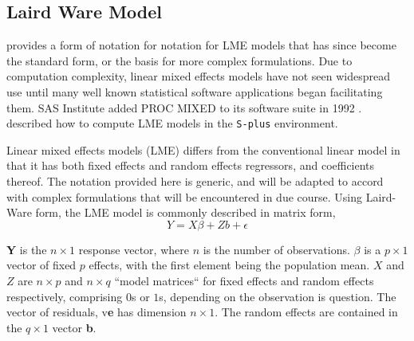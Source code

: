 \documentclass[12pt, a4paper]{report}
\theoremstyle{plain}
\theoremstyle{definition}
\theoremstyle{remark}
\begin{document}
	\subsection{Laird Ware Model} 
	\citet{LW82} provides a form of notation for notation for LME models that has since become the standard form, or the basis for more complex formulations. Due to computation complexity, linear mixed effects models have not seen widespread use until many well known statistical software applications began facilitating them. SAS Institute added PROC MIXED to its software suite in 1992 \citep{singer}. \citet{PB} described how to compute LME models in the \texttt{S-plus} environment.
	
	Linear mixed effects models (LME)
	differs from the conventional linear model in that it has both
	fixed effects and random effects regressors, and coefficients
	thereof. The notation provided here is generic, and will be adapted to accord with complex formulations that will be encountered in due course. Using Laird-Ware form, the LME model is commonly described in matrix form,
	\begin{equation}
	Y = X\beta + Zb + \epsilon
	\label{LW}
	\end{equation}
	
	\textbf{Y} is the $n
	\times 1$ response vector, where  $n$ is the number of observations. \textbf{$\beta$} is a $p \times 1$ vector of fixed $p$ effects, with the
	first element being the population mean. $X$ and $Z$ are $n \times p$ and $n \times q$ ``model matrices`` for fixed effects and random effects respectively, comprising
	$0$s or $1$s, depending on the observation is question. The vector of residuals, v\textbf{e} has
	dimension $n \times 1$. The random effects are contained in the  $q \times
	1$ vector \textbf{b}.
			
			
			
			
\end{document}
